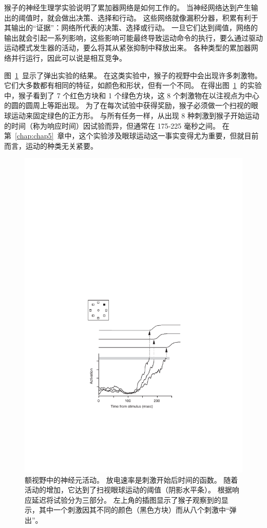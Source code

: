 猴子的神经生理学实验说明了累加器网络是如何工作的。
当神经网络达到产生输出的阈值时，就会做出决策、选择和行动。
这些网络就像漏积分器，积累有利于其输出的“证据”：网络所代表的决策、选择或行动。
一旦它们达到阈值，网络的输出就会引起一系列影响，这些影响可能最终导致运动命令的执行，要么通过驱动运动模式发生器的活动，要么将其从紧张抑制中释放出来。
各种类型的累加器网络并行运行，因此可以说是相互竞争。\par


图~\ref{fig:3_4}~显示了弹出实验的结果。
在这类实验中，猴子的视野中会出现许多刺激物。
它们大多数都有相同的特征，如颜色和形状，但有一个不同。
在得出图~\ref{fig:3_4}~的实验中，猴子看到了 7 个红色方块和 1 个绿色方块，这 8 个刺激物在以注视点为中心的圆的圆周上等距出现。
为了在每次试验中获得奖励，猴子必须做一个扫视的眼球运动来固定绿色的正方形。
与所有任务一样，从出现 8 种刺激到猴子开始运动的时间（称为响应时间）因试验而异，但通常在 175-225 毫秒之间。
在第~\ref{chap:chap5}~章中，这个实验涉及眼球运动这一事实变得尤为重要，但就目前而言，运动的种类无关紧要。\par


\begin{figure}[!htb]
	\centering
	\includegraphics{chap3/3_4}
	\caption{额视野中的神经元活动。
		放电速率是刺激开始后时间的函数。
		随着活动的增加，它达到了扫视眼球运动的阈值（阴影水平条）。
		根据响应延迟将试验分为三部分。
		左上角的插图显示了猴子观察到的显示，其中一个刺激因其不同的颜色（黑色方块）而从八个刺激中“弹出”\cite{schall1999neural}。}
	\label{fig:3_4}
\end{figure}


